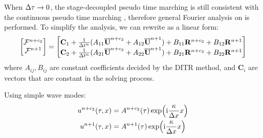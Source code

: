\documentclass[preprint,12pt]{elsarticle}
\begin{document}
When $\mathrm\Delta \tau \rightarrow 0$, the stage-decoupled pseudo time marching
 is still consistent with the continuous
pseudo time marching , therefore
general Fourier analysis on  is performed.
To simplify the analysis, we can rewrite 
as a linear form:
\newcommand{\A}{\mathbf{A}}
\newcommand{\B}{\mathbf{B}}
\newcommand{\C}{\mathbf{C}}
\begin{equation}
    \begin{bmatrix}
        \FF^{n+c_2} \\
        \FF^{n+1}
    \end{bmatrix}
    =
    \begin{bmatrix}
        \C_1 + \frac{1}{\inc t^n}(A_{11}\uu^{n+c_2} + A_{12}\uu^{n+1})
        + B_{11}\R^{n+c_2} + B_{12}\R^{n+1} \\
        \C_2 + \frac{1}{\inc t^n}(A_{21}\uu^{n+c_2} + A_{22}\uu^{n+1})
        + B_{21}\R^{n+c_2} + B_{22}\R^{n+1}
    \end{bmatrix}
    \label{eq:linearDITRFF}
\end{equation}
where $A_{ij},B_{ij}$ are constant coefficients
decided by the DITR method, and $\C_i$ are
vectors that are constant in the solving process.

Using simple wave modes:
\begin{equation}
    \begin{aligned}
        u^{n+c_2}(\tau,x) & = A^{n+c_2}(\tau)\exp(\mathrm{i} \frac{\kappa}{\mathrm\Delta x} x) \\
        u^{n+1}(\tau,x)   & = A^{n+1}(\tau)\exp(\mathrm{i} \frac{\kappa}{\mathrm\Delta x} x)
    \end{aligned}
\end{equation}
\end{document}
